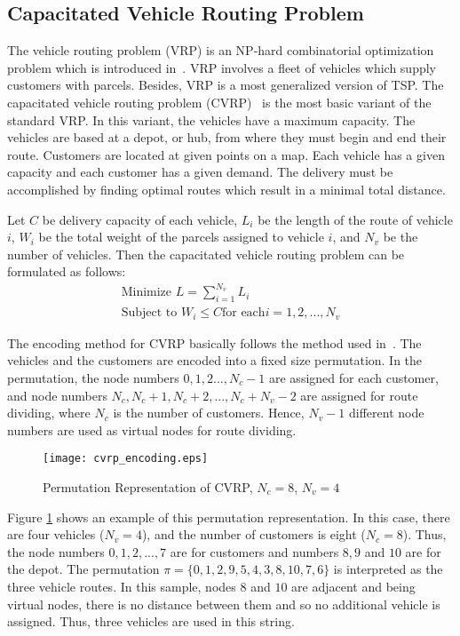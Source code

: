 \subsection{Capacitated Vehicle Routing Problem}
\label{section:cvrp}
The vehicle routing problem (VRP) is an NP-hard combinatorial optimization problem which is introduced in~\cite{dantzig1959}. VRP involves a fleet of vehicles which supply customers with parcels.
Besides, VRP is a most generalized version of TSP. The capacitated vehicle routing problem (CVRP)~\cite{toth2001vehicle} is the most basic variant of the standard VRP. In this variant, the vehicles have a maximum capacity. The vehicles are based at a depot, or hub, from where they must begin and end their route. Customers are located at given points on a map. Each vehicle has a given capacity and each customer has a given demand. The delivery must be accomplished by finding optimal routes which result in a minimal total distance.

Let $C$ be delivery capacity of each vehicle, $L_i$ be the length of the route of vehicle $i$, $W_i$ be the total weight of the parcels assigned to vehicle $i$, and $N_v$ be the number of vehicles. Then the capacitated vehicle routing problem can be formulated as follows:
\begin{eqnarray*}
    \text{Minimize } L=\sum_{i=1}^{N_v}{L_i} \\
    \text{Subject to } W_i \leq C \text{for each} i = 1,2,...,N_v
\end{eqnarray*}

The encoding method for CVRP basically follows the method used in~\citep{tsutsui2004solving}. The vehicles and the customers are encoded into a fixed size permutation. In the permutation, the node numbers $0,1,2...,N_c-1$ are assigned for each customer, and node numbers $N_c, N_c+1, N_c+2,...,N_c+N_v-2$ are assigned for route dividing, where $N_c$ is the number of customers. Hence, $N_v-1$ different node numbers are used as virtual nodes for route dividing.

\begin{figure}[t]
    \centering
    \texttt{[image: cvrp\_encoding.eps]}
    \caption{Permutation Representation of CVRP, $N_c = 8$, $N_v = 4$}
	\label{fig:cvrp_encoding}
\end{figure}

Figure \ref{fig:cvrp_encoding} shows an example of this permutation representation. In this case, there are four vehicles ($N_v = 4$), and the number of customers is eight ($N_c =8$). Thus, the node numbers $0,1,2,...,7$ are for customers and numbers $8,9$ and $10$ are for the depot. The permutation $\pi = \{ 0,1,2,9,5,4,3,8,10,7,6 \}$ is interpreted as the three vehicle routes. In  this  sample, nodes $8$ and $10$ are adjacent and being virtual nodes, there is no distance between them and so no additional vehicle is assigned. Thus, three vehicles are used in this string. 

